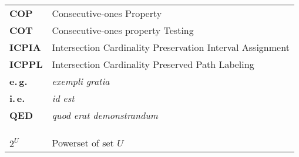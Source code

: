 \abbreviations

\begin{tabular}{ll}
  \textbf{COP}& Consecutive-ones Property \\
  \textbf{COT}& Consecutive-ones property Testing \\
  \textbf{ICPIA}& Intersection Cardinality Preservation Interval
  Assignment \\
  \textbf{ICPPL}& Intersection Cardinality Preserved Path Labeling \\ 
  \textbf{e.\,g.}& {\em exempli gratia} \\ 
  \textbf{i.\,e.}& {\em id est}\\
  \textbf{QED}& {\em quod erat demonstrandum}\\

  &\\
  \hline
  &\\
  &\\
  \textbf{$2^{U}$}  & Powerset of set $U$
\end{tabular}